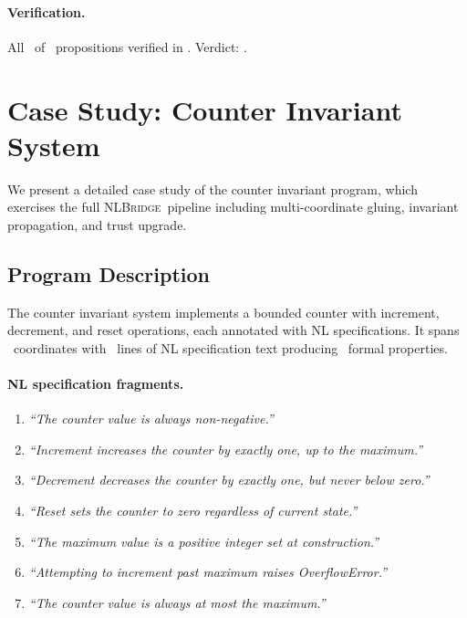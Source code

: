 \documentclass[11pt]{article}
\newcommand{\NLBridge}{\textsc{NLBridge}}
\begin{document}
\paragraph{Verification.}
All \ppLXXnlstackcontractOk\ of \ppLXXnlstackcontractProps\
propositions verified in \ppLXXnlstackcontractTime.
Verdict: \ppLXXnlstackcontractVerdict.

\section{Case Study: Counter Invariant System}\label{sec:case-study}

We present a detailed case study of the counter invariant program,
which exercises the full \NLBridge\ pipeline including multi-coordinate
gluing, invariant propagation, and trust upgrade.

\subsection{Program Description}

The counter invariant system implements a bounded counter with
increment, decrement, and reset operations, each annotated with NL
specifications.  It spans \ppLXXnlcounterinvariantCoords\ coordinates
with \ppLXXnlcounterinvariantNlLines\ lines of NL specification text
producing \ppLXXnlcounterinvariantProps\ formal properties.

\paragraph{NL specification fragments.}
\begin{enumerate}[noitemsep]
  \item \emph{``The counter value is always non-negative.''}
  \item \emph{``Increment increases the counter by exactly one, up to
        the maximum.''}
  \item \emph{``Decrement decreases the counter by exactly one, but
        never below zero.''}
  \item \emph{``Reset sets the counter to zero regardless of current
        state.''}
  \item \emph{``The maximum value is a positive integer set at
        construction.''}
  \item \emph{``Attempting to increment past maximum raises
        OverflowError.''}
  \item \emph{``The counter value is always at most the maximum.''}
\end{enumerate}
\end{document}

